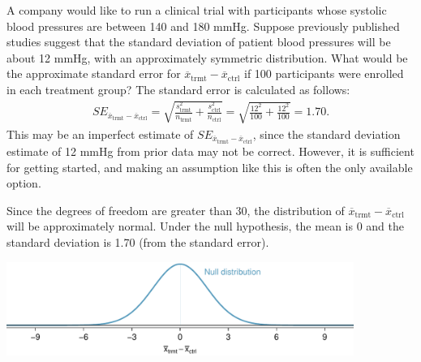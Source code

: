 \begin{examplewrap}
\begin{nexample}{A company would like to run a clinical trial with participants whose systolic blood pressures are between 140 and 180 mmHg. Suppose previously published studies suggest that the standard deviation of patient blood pressures will be about 12 mmHg, with an approximately symmetric distribution.\footnotemark{} What would be the approximate standard error for $\overline{x}_{ \text{trmt}} - \overline{x}_{ \text{ctrl}}$ if 100 participants were enrolled in each treatment group?}
The standard error is calculated as follows:
\begin{align*}
SE_{\overline{x}_{ \text{trmt}} - \overline{x}_{ \text{ctrl}}}
  = \sqrt{\frac{s_{ \text{trmt}}^2}{n_{ \text{trmt}}} + \frac{s_{ \text{ctrl}}^2}{n_{ \text{ctrl}}}}
  = \sqrt{\frac{12^2}{100} + \frac{12^2}{100}}
  = 1.70.
\end{align*}
This may be an imperfect estimate of $SE_{\overline{x}_{ \text{trmt}} - \overline{x}_{\text{ctrl}}}$, since the standard deviation estimate of 12 mmHg from prior data may not be correct. However, it is sufficient for getting started, and making an assumption like this is often the only available option. 
\end{nexample}
\end{examplewrap}

\textD{\newpage}

Since the degrees of freedom are greater than 30, the distribution of $\overline{x}_{ \text{trmt}} - \overline{x}_{ \text{ctrl}}$ will be approximately normal. Under the null hypothesis, the mean is 0 and the standard deviation is 1.70 (from the standard error).

\begin{center}
	\includegraphics[width=0.85\textwidth]{ch_inference_for_means_oi_biostat/figures/power_null_0_1-7/power_null_A_0_1-7}
\end{center}


